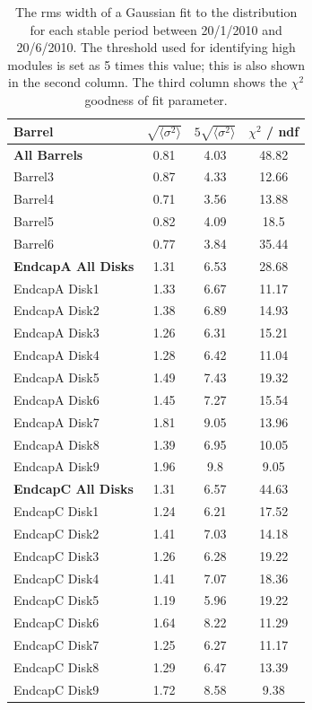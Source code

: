 \begin{table}[h]
 \centering
\begin{tabular}{| l | c | c | c |}
\hline
Barrel & $\sqrt{\langle \sigma ^ 2 \rangle }$ & $5\sqrt{\langle \sigma ^ 2 \rangle }$ & $\chi ^2$  / ndf\\
\hline
\textbf{All Barrels} & 0.81 & 4.03 & 48.82 \\
Barrel3 & 0.87 & 4.33 & 12.66 \\
Barrel4 & 0.71 & 3.56 & 13.88 \\
Barrel5 & 0.82 & 4.09 & 18.5 \\
Barrel6 & 0.77 & 3.84 & 35.44 \\
\hline
\textbf{EndcapA All Disks} & 1.31 & 6.53 & 28.68 \\
EndcapA Disk1 & 1.33 & 6.67 & 11.17 \\
EndcapA Disk2 & 1.38 & 6.89 & 14.93 \\
EndcapA Disk3 & 1.26 & 6.31 & 15.21 \\
EndcapA Disk4 & 1.28 & 6.42 & 11.04 \\
EndcapA Disk5 & 1.49 & 7.43 & 19.32 \\
EndcapA Disk6 & 1.45 & 7.27 & 15.54 \\
EndcapA Disk7 & 1.81 & 9.05 & 13.96 \\
EndcapA Disk8 & 1.39 & 6.95 & 10.05 \\
EndcapA Disk9 & 1.96 & 9.8 & 9.05 \\
\hline
\textbf{EndcapC All Disks} & 1.31 & 6.57 & 44.63 \\
EndcapC Disk1 & 1.24 & 6.21 & 17.52 \\
EndcapC Disk2 & 1.41 & 7.03 & 14.18 \\
EndcapC Disk3 & 1.26 & 6.28 & 19.22 \\
EndcapC Disk4 & 1.41 & 7.07 & 18.36 \\
EndcapC Disk5 & 1.19 & 5.96 & 19.22 \\
EndcapC Disk6 & 1.64 & 8.22 & 11.29 \\
EndcapC Disk7 & 1.25 & 6.27 & 11.17 \\
EndcapC Disk8 & 1.29 & 6.47 & 13.39 \\
EndcapC Disk9 & 1.72 & 8.58 & 9.38 \\
\hline
\end{tabular}
\caption{The rms width of a Gaussian fit to the \tdiff distribution for each stable period between 20/1/2010 and 20/6/2010. The threshold used for identifying high \tdiff modules is set as 5 times this value; this is also shown in the second column. The third column shows the $\chi^2$ goodness of fit parameter.}
\label{table:tdiff_thresh}
\end{table}

